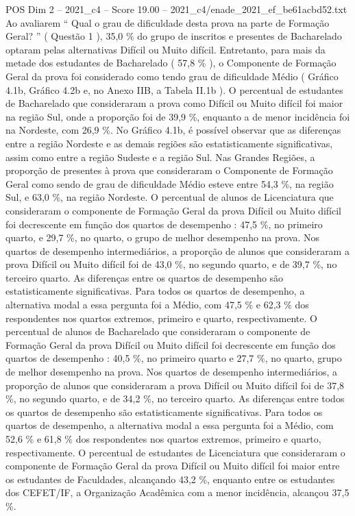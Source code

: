 \begin{textsample}{POS Dim 2 – 2021\_c4 – Score 19.00 – 2021\_c4/enade\_2021\_ef\_be61acbd52.txt}
Ao avaliarem “ Qual o grau de dificuldade desta prova na parte de Formação Geral? ” ( Questão 1 ), 35,0 \% do grupo de inscritos e presentes de Bacharelado optaram pelas alternativas Difícil ou Muito difícil.
Entretanto, para mais da metade dos estudantes de Bacharelado ( 57,8 \% ), o Componente de Formação Geral da prova foi considerado como tendo grau de dificuldade Médio ( Gráfico 4.1b, Gráfico 4.2b e, no Anexo IIB, a Tabela II.1b ).
O percentual de estudantes de Bacharelado que consideraram a prova como Difícil ou Muito difícil foi maior na região Sul, onde a proporção foi de 39,9 \%, enquanto a de menor incidência foi na Nordeste, com 26,9 \%.
No Gráfico 4.1b, é possível observar que as diferenças entre a região Nordeste e as demais regiões são estatisticamente significativas, assim como entre a região Sudeste e a região Sul.
Nas Grandes Regiões, a proporção de presentes à prova que consideraram o Componente de Formação Geral como sendo de grau de dificuldade Médio esteve entre 54,3 \%, na região Sul, e 63,0 \%, na região Nordeste.
O percentual de alunos de Licenciatura que consideraram o componente de Formação Geral da prova Difícil ou Muito difícil foi decrescente em função dos quartos de desempenho : 47,5 \%, no primeiro quarto, e 29,7 \%, no quarto, o grupo de melhor desempenho na prova.
Nos quartos de desempenho intermediários, a proporção de alunos que consideraram a prova Difícil ou Muito difícil foi de 43,0 \%, no segundo quarto, e de 39,7 \%, no terceiro quarto.
As diferenças entre os quartos de desempenho são estatisticamente significativas.
Para todos os quartos de desempenho, a alternativa modal a essa pergunta foi a Médio, com 47,5 \% e 62,3 \% dos respondentes nos quartos extremos, primeiro e quarto, respectivamente.
O percentual de alunos de Bacharelado que consideraram o componente de Formação Geral da prova Difícil ou Muito difícil foi decrescente em função dos quartos de desempenho : 40,5 \%, no primeiro quarto e 27,7 \%, no quarto, grupo de melhor desempenho na prova.
Nos quartos de desempenho intermediários, a proporção de alunos que consideraram a prova Difícil ou Muito difícil foi de 37,8 \%, no segundo quarto, e de 34,2 \%, no terceiro quarto.
As diferenças entre todos os quartos de desempenho são estatisticamente significativas.
Para todos os quartos de desempenho, a alternativa modal a essa pergunta foi a Médio, com 52,6 \% e 61,8 \% dos respondentes nos quartos extremos, primeiro e quarto, respectivamente.
O percentual de estudantes de Licenciatura que consideraram o componente de Formação Geral da prova Difícil ou Muito difícil foi maior entre os estudantes de Faculdades, alcançando 43,2 \%, enquanto entre os estudantes dos CEFET/IF, a Organização Acadêmica com a menor incidência, alcançou 37,5 \%.

\end{textsample}
